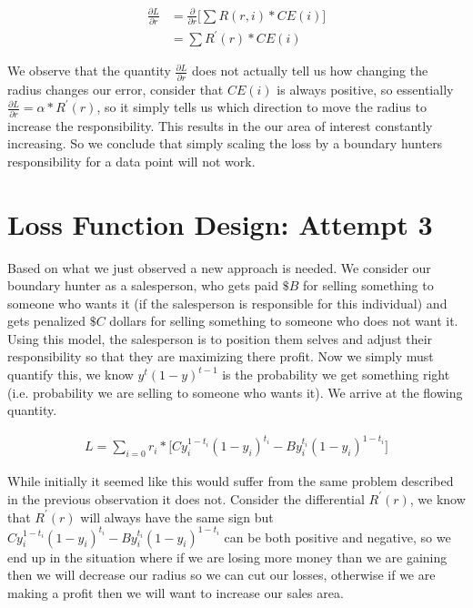 \documentclass[notitlepage]{report}
\theoremstyle{definition}
\begin{document}
\begin{align*}
\frac{\partial L}{\partial r} &= \frac{\partial}{\partial r} \big[ \sum R(r, i) * CE(i) \big] \\
&= \sum R^{'} (r) * CE(i)
\end{align*} 

We observe that the quantity $\frac{\partial L}{\partial r}$ does not actually tell us how changing the radius changes our error, consider that $CE(i)$ is always positive, so essentially $\frac{\partial L}{\partial r} = \alpha * R^{'}(r)$, so it simply tells us which direction to move the radius to increase the responsibility. This results in the our area of interest constantly increasing. So we conclude that simply scaling the loss by a boundary hunters responsibility for a data point will not work.\\

\section{Loss Function Design: Attempt 3}
Based on what we just observed a new approach is needed. We consider our boundary hunter as a salesperson, who gets paid $\$B$ for selling something to someone who wants it (if the salesperson is responsible for this individual) and gets penalized $\$C$ dollars for selling something to someone who does not want it. Using this model, the salesperson is to position them selves and adjust their responsibility so that they are maximizing there profit. Now we simply must quantify this, we know $y^t(1-y)^{t-1}$ is the probability we get something right (i.e. probability we are selling to someone who wants it). We arrive at the flowing quantity.

\begin{align}
L = \sum_{i=0} r_i * \big[Cy_i^{1-t_i}(1-y_i)^{t_i} - By_i^{t_i}(1-y_i)^{1-t_i} \big] 
\end{align}

While initially it seemed like this would suffer from the same problem described in the previous observation it does not. Consider the differential $R^{'}(r)$, we know that $R^{'}(r)$ will always have the same sign but $Cy_i^{1-t_i}(1-y_i)^{t_i} - By_i^{t_i}(1-y_i)^{1-t_i}$ can be both positive and negative, so we end up in the situation where if we are losing more money than we are gaining then we will decrease our radius so we can cut our losses, otherwise if we are making a profit then we will want to increase our sales area. 
\end{document}
